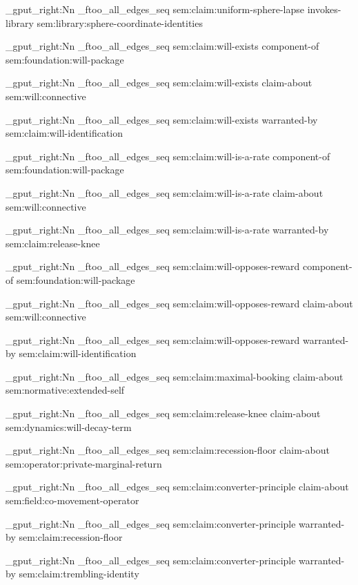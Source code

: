 \seq_gput_right:Nn \g_ftoo_all_edges_seq { { sem:claim:uniform-sphere-lapse } { invokes-library } { sem:library:sphere-coordinate-identities } }

\seq_gput_right:Nn \g_ftoo_all_edges_seq { { sem:claim:will-exists } { component-of } { sem:foundation:will-package } }

\seq_gput_right:Nn \g_ftoo_all_edges_seq { { sem:claim:will-exists } { claim-about } { sem:will:connective } }

\seq_gput_right:Nn \g_ftoo_all_edges_seq { { sem:claim:will-exists } { warranted-by } { sem:claim:will-identification } }

\seq_gput_right:Nn \g_ftoo_all_edges_seq { { sem:claim:will-is-a-rate } { component-of } { sem:foundation:will-package } }

\seq_gput_right:Nn \g_ftoo_all_edges_seq { { sem:claim:will-is-a-rate } { claim-about } { sem:will:connective } }

\seq_gput_right:Nn \g_ftoo_all_edges_seq { { sem:claim:will-is-a-rate } { warranted-by } { sem:claim:release-knee } }

\seq_gput_right:Nn \g_ftoo_all_edges_seq { { sem:claim:will-opposes-reward } { component-of } { sem:foundation:will-package } }

\seq_gput_right:Nn \g_ftoo_all_edges_seq { { sem:claim:will-opposes-reward } { claim-about } { sem:will:connective } }

\seq_gput_right:Nn \g_ftoo_all_edges_seq { { sem:claim:will-opposes-reward } { warranted-by } { sem:claim:will-identification } }

\seq_gput_right:Nn \g_ftoo_all_edges_seq { { sem:claim:maximal-booking } { claim-about } { sem:normative:extended-self } }

\seq_gput_right:Nn \g_ftoo_all_edges_seq { { sem:claim:release-knee } { claim-about } { sem:dynamics:will-decay-term } }

\seq_gput_right:Nn \g_ftoo_all_edges_seq { { sem:claim:recession-floor } { claim-about } { sem:operator:private-marginal-return } }

\seq_gput_right:Nn \g_ftoo_all_edges_seq { { sem:claim:converter-principle } { claim-about } { sem:field:co-movement-operator } }

\seq_gput_right:Nn \g_ftoo_all_edges_seq { { sem:claim:converter-principle } { warranted-by } { sem:claim:recession-floor } }

\seq_gput_right:Nn \g_ftoo_all_edges_seq { { sem:claim:converter-principle } { warranted-by } { sem:claim:trembling-identity } }

